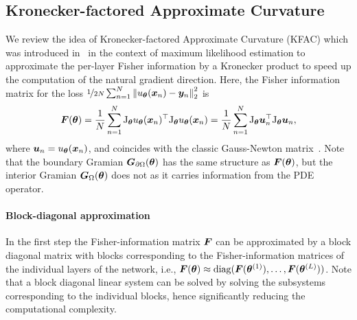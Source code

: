 \subsection{Kronecker-factored Approximate Curvature}


We review the idea of Kronecker-factored Approximate Curvature (KFAC) which was introduced in~\citet{heskes2000natural, martens2015optimizing} in the context of maximum likelihood estimation to approximate the per-layer Fisher information by a Kronecker product to speed up the computation of the natural gradient direction. 
Here, the Fisher information matrix 
for the loss $\nicefrac{1}{2N} \sum_{n=1}^N \left\lVert u_{\bm{\theta}}({\bm{x}}_n) - {\bm{y}}_n \right\rVert_2^2$ is 
\begin{equation}
  {\bm{F}}({\bm{\theta}}) = \frac1N\sum_{n=1}^N \mathrm{J}_{{\bm{\theta}}} u_{{\bm{\theta}}}({\bm{x}}_n)^\top \mathrm{J}_{{\bm{\theta}}} u_{{\bm{\theta}}}({\bm{x}}_n) = \frac1N\sum_{n=1}^N \mathrm{J}_{{\bm{\theta}}} {\bm{u}}_n^\top \mathrm{J}_{{\bm{\theta}}} {\bm{u}}_n
  ,
 \end{equation}
where ${\bm{u}}_n = u_{\bm{\theta}}({\bm{x}}_n)$, and coincides with the classic Gauss-Newton matrix~\citep{martens2020new, eschenhagen2023kroneckerfactored}.
Note that the boundary Gramian ${\bm{G}}_{\partial\Omega}({\bm{\theta}})$ has the same structure as ${\bm{F}}({\bm{\theta}})$, but the interior Gramian ${\bm{G}}_\Omega({\bm{\theta}})$ does not as it carries information from the PDE operator. 



\paragraph{Block-diagonal approximation}
In the first step the Fisher-information matrix ${\bm{F}}$ can be approximated by a block diagonal matrix with blocks corresponding to the Fisher-information matrices of the individual layers of the network, i.e., ${\bm{F}}({\bm{\theta}}) \approx \operatorname{diag}({\bm{F}}({\bm{\theta}}^{(1)}), \dots, {\bm{F}}({\bm{\theta}}^{(L)}))$.
Note that a block diagonal linear system can be solved by solving the subsystems corresponding to the individual blocks, hence significantly reducing the computational complexity.


